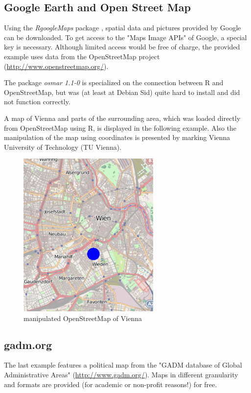 \documentclass{ifacconf}
\begin{document}
\subsection{Google Earth and Open Street Map}
Using the \textit{RgoogleMaps} package \citep{RgoogleMaps}, spatial data and
pictures provided by Google can be downloaded. To get access to the 
"Maps Image APIs" of Google, a special key is necessary. Although limited access would be free
of charge, the provided example uses data from the OpenStreetMap project 
(\url{http://www.openstreetmap.org/}).

The package \textit{osmar 1.1-0} is specialized on the connection
between R and OpenStreetMap, but was (at least at Debian Sid) quite hard to install
and did not function correctly.

A map of Vienna and parts of the surrounding area, which was loaded directly
from OpenStreetMap using R, is displayed in the following example. 
Also the manipulation of the map using coordinates is presented by marking
Vienna University of Technology (TU Vienna).


\begin{figure}[h]
\begin{center}
\includegraphics[width=7cm, angle=90]{pics/hometu.png}    %
\caption{manipulated OpenStreetMap of Vienna} 
\label{fig:hometu}
\end{center}
\end{figure}


\subsection{gadm.org}
The last example features a political map from 
the "GADM database of Global Administrative Areas" (\url{http://www.gadm.org/}).
Maps in different granularity and formats are provided (for academic or
non-profit reasons!) for free.
\end{document}

